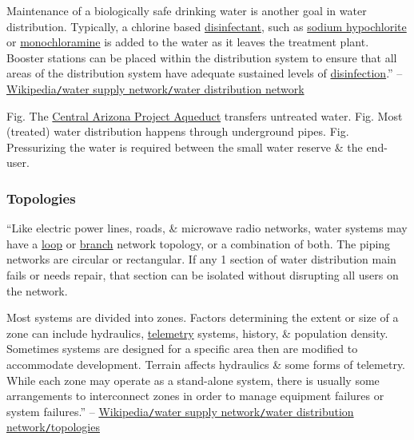 \documentclass[oneside]{book}
\numberwithin{equation}{section}
\begin{document}
Maintenance of a biologically safe drinking water is another goal in water distribution. Typically, a chlorine based \href{https://en.wikipedia.org/wiki/Disinfectant}{disinfectant}, such as \href{https://en.wikipedia.org/wiki/Sodium_hypochlorite}{sodium hypochlorite} or \href{https://en.wikipedia.org/wiki/Monochloramine}{monochloramine} is added to the water as it leaves the treatment plant. Booster stations can be placed within the distribution system to ensure that all areas of the distribution system have adequate sustained levels of \href{https://en.wikipedia.org/wiki/Disinfection}{disinfection}.'' -- \href{https://en.wikipedia.org/wiki/Water_supply_network#Water_distribution_network}{Wikipedia\texttt{/}water supply network\texttt{/}water distribution network}

\textsf{Fig. The \href{https://en.wikipedia.org/wiki/Central_Arizona_Project_Aqueduct}{Central Arizona Project Aqueduct} transfers untreated water.} \textsf{Fig. Most (treated) water distribution happens through underground pipes.} \textsf{Fig. Pressurizing the water is required between the small water reserve \& the end-user.}

\subsubsection{Topologies}
``Like electric power lines, roads, \& microwave radio networks, water systems may have a \href{https://en.wikipedia.org/wiki/Loop_(graph_theory)}{loop} or \href{https://en.wikipedia.org/wiki/Graph_theory}{branch} network topology, or a combination of both. The piping networks are circular or rectangular. If any 1 section of water distribution main fails or needs repair, that section can be isolated without disrupting all users on the network.

Most systems are divided into zones. Factors determining the extent or size of a zone can include hydraulics, \href{https://en.wikipedia.org/wiki/Telemetry#Water_management}{telemetry} systems, history, \& population density. Sometimes systems are designed for a specific area then are modified to accommodate development. Terrain affects hydraulics \& some forms of telemetry. While each zone may operate as a stand-alone system, there is usually some arrangements to interconnect zones in order to manage equipment failures or system failures.'' -- \href{https://en.wikipedia.org/wiki/Water_supply_network#Topologies}{Wikipedia\texttt{/}water supply network\texttt{/}water distribution network\texttt{/}topologies}
\end{document}
